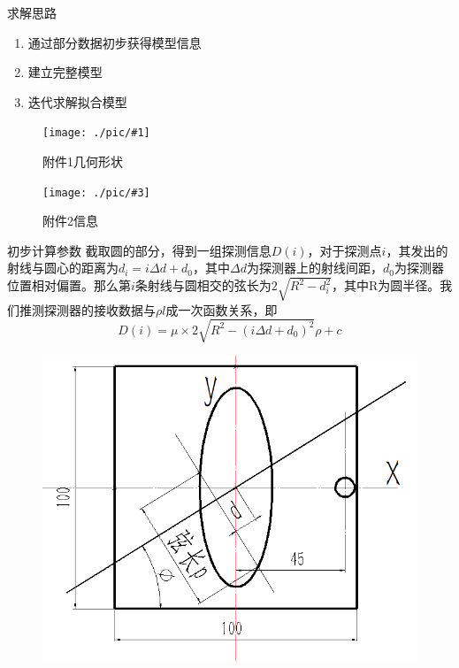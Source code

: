 \documentclass[serif]{beamer} %
\newcommand{\doublepic}[4]{ \begin{figure}[H]
\begin{minipage}[H]{0.45\textwidth}
\centering
\texttt{[image: ./pic/\#1]}
\caption{#2}
\end{minipage}
\begin{minipage}[H]{0.45\textwidth}
\centering
\texttt{[image: ./pic/\#3]}
\caption{#4}
\end{minipage}
\end{figure}}
\begin{document}
\begin{frame}{求解思路}
	\begin{enumerate}
		\item 通过部分数据初步获得模型信息
		\item 建立完整模型
		\item 迭代求解拟合模型
	\end{enumerate}
	\doublepic{fujian1.png}{附件1几何形状}{fujian2.png}{附件2信息}
\end{frame}

\begin{frame}{初步计算参数}
	\small 截取圆的部分，得到一组探测信息\(D(i)\)，对于探测点\(i\)，其发出的射线与圆心的距离为\(d_i = i\Delta d + d_0\)，其中\(\Delta d\)为探测器上的射线间距，\(d_0\)为探测器位置相对偏置。那么第\(i\)条射线与圆相交的弦长为\(2\sqrt{R^2 - d_i^2}\)，其中R为圆半径。我们推测探测器的接收数据与\(\rho l\)成一次函数关系，即
	\begin{equation}
		D(i)  = \mu\times 2\sqrt{R^2 - ( i\Delta d + d_0)^2}\rho  +c
	\end{equation}
	\begin{figure}[H]
		\begin{minipage}[H]{0.45\textwidth}
		\centering
		\includegraphics[width=\textwidth]{./pic/q10.png}
		\end{minipage}
		\begin{minipage}[H]{0.45\textwidth}
		\centering

\end{minipage}
\end{figure}
\end{frame}
\end{document}
